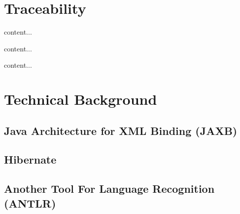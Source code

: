 \section{Traceability}
\cite{DBLP:books/daglib/p/GotelCHZEGDAMM12}

\begin{definition}[Trace]
content...
\end{definition}

\begin{definition}
content...
\end{definition}


\begin{definition}
content...
\end{definition}


\section{Technical Background}


\subsection{\megalxtext}
\cite{DBLP:conf/sattose/BaggeZ14}
\cite{DBLP:journals/entcs/FavreN05}

\cite{DBLP:conf/ecmdafa/LammelV14}
\cite{DBLP:conf/models/FavreLV12}
\cite{DBLP:conf/sle/Lammel16}

\cite{LukasHaertelBScThesis}

\subsection{Java Architecture for XML Binding (JAXB)}

\subsection{Hibernate}

\subsection{Another Tool For Language Recognition (ANTLR)}
\cite{Parr:2013:DAR:2501720}

